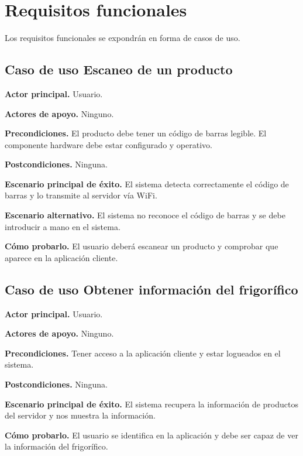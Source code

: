 \section{Requisitos funcionales}

Los requisitos funcionales se expondrán en forma de casos de uso.

\subsection{Caso de uso Escaneo de un producto}

\textbf{Actor principal.} Usuario.

\textbf{Actores de apoyo.} Ninguno.

\textbf{Precondiciones.} El producto debe tener un código de barras legible. El componente hardware debe estar configurado y operativo.

\textbf{Postcondiciones.} Ninguna.

\textbf{Escenario principal de éxito.} El sistema detecta correctamente el código de barras y lo transmite al servidor vía WiFi.

\textbf{Escenario alternativo.} El sistema no reconoce el código de barras y se debe introducir a mano en el sistema.

\textbf{Cómo probarlo.} El usuario deberá escanear un producto y comprobar que aparece en la aplicación cliente.

\subsection{Caso de uso Obtener información del frigorífico}

\textbf{Actor principal.} Usuario.

\textbf{Actores de apoyo.} Ninguno.

\textbf{Precondiciones.} Tener acceso a la aplicación cliente y estar logueados en el sistema.

\textbf{Postcondiciones.} Ninguna.

\textbf{Escenario principal de éxito.} El sistema recupera la información de productos del servidor y nos muestra la información.

\textbf{Cómo probarlo.} El usuario se identifica en la aplicación y debe ser capaz de ver la información del frigorífico.
